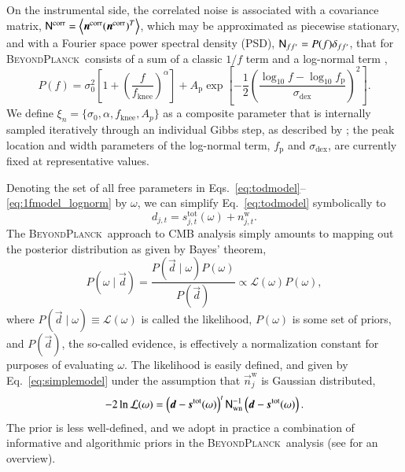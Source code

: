\documentclass[twocolumn]{aa}%
\renewcommand{\d}[0]{\vec{d}}
\newcommand{\n}[0]{\vec{n}}
\newcommand{\s}[0]{\vec{s}}
\newcommand{\N}[0]{\tens{N}}
\newcommand{\BP}{\textsc{BeyondPlanck}}
\begin{document}
On the instrumental side, the correlated noise is associated with a
covariance matrix, $\N^{\mathrm{corr}} = \left<\n^{\mathrm{corr}}
(\n^{\mathrm{corr}})^T \right>$, which may be approximated as piecewise
stationary, and with a Fourier space power spectral density (PSD),
$\N_{ff'} = P(f)\delta_{ff'}$, that for \BP\ consists of a sum of a classic
$1/f$ term and a log-normal term \citep{bp06}, {\small
\begin{equation}
        P(f) = \sigma_0^2\left[1 +
        \left(\frac{f}{f_\mathrm{knee}}\right)^\alpha\right] + A_\mathrm{p} \exp\left[-\frac{1}{2}\left(\frac{\log_{10}f - \log_{10} f_\mathrm{p}}{\sigma_\mathrm{dex}}\right)^2\right].
        \label{eq:1fmodel_lognorm}
\end{equation}}
We define $\xi_n=\{\sigma_0,\alpha,f_{\mathrm{knee}},A_p\}$ as a
composite parameter that is internally sampled iteratively through an
individual Gibbs step, as described by \citet{bp06}; the peak location
and width parameters of the log-normal term, $f_{\mathrm{p}}$ and
$\sigma_\mathrm{dex}$, are currently fixed at representative values.

Denoting the set of all free parameters in
Eqs.~\eqref{eq:todmodel}--\eqref{eq:1fmodel_lognorm} by $\omega$, we
can simplify Eq.~\eqref{eq:todmodel} symbolically to
\begin{equation}
  d_{j,t} = s^{\mathrm{tot}}_{j,t}(\omega) + n^{\mathrm{w}}_{j,t}.
  \label{eq:simplemodel}
\end{equation}
The \BP\ approach to CMB analysis simply amounts to mapping out the
posterior distribution as given by Bayes' theorem,
\begin{equation}
  P(\omega\mid \d) = \frac{P(\d\mid \omega)P(\omega)}{P(\d)} \propto
  \mathcal{L}(\omega)P(\omega),
  \label{eq:jointpost}
\end{equation}
where $P(\d\mid \omega)\equiv\mathcal{L}(\omega)$ is called the
likelihood, $P(\omega)$ is some set of priors, and $P(\d)$, the so-called evidence, is effectively a
normalization constant for purposes of evaluating $\omega$. The likelihood is easily defined, and given by
Eq.~\eqref{eq:simplemodel} under the assumption that
$\n^{\mathrm{w}}_{j}$ is Gaussian distributed,
\begin{equation}
-2\ln\mathcal{L}(\omega) = \left(\d-\s^{\mathrm{tot}}(\omega)\right)^t\N_{\mathrm{wn}}^{-1}\left(\d-\s^{\mathrm{tot}}(\omega)\right).
\end{equation}
The prior is less well-defined, and we adopt in practice a combination
of informative and algorithmic priors in the \BP\ analysis (see
\citet{bp01} for an overview).
\end{document}
